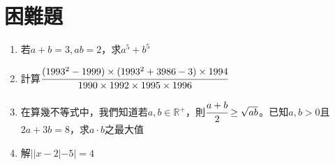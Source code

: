 \documentclass[12pt,a4paper]{article}
\begin{document}
\section{困難題}
\begin{enumerate}
    \item 若$a+b=3, ab=2$，求$a^5+b^5$\vspace{2cm}
    \item 計算$\cfrac{(1993^2-1999)\times (1993^2+3986-3)\times 1994}{1990\times 1992 \times 1995 \times 1996}$\vspace{2cm}
    \item 在算幾不等式中，我們知道若$a, b\in\mathbb{R}^+$，則$\cfrac{a+b}{2}\geq\sqrt{ab}$。已知$a, b>0$且$2a+3b=8$，求$a\cdot b$之最大值\vspace{2cm}
    \item 解$||x-2| -5|=4$\vspace{2cm}
\end{enumerate}
\end{document}
